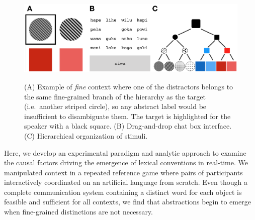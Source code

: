 \begin{figure}[t]
\begin{center}
{\includegraphics[scale=.55]{./figures/Sec2-design.png}}
{\caption{{(A) Example of \emph{fine} context where one of the distractors belongs to the same fine-grained branch of the hierarchy as the target (i.e.\ another striped circle), so any abstract label would be insufficient to disambiguate them. The target is highlighted for the speaker with a black square. (B) Drag-and-drop chat box interface. (C) Hierarchical organization of stimuli.\label{fig:context_design}}}}
\vspace{-2ex}
\end{center}
\end{figure}

Here, we develop an experimental paradigm and analytic approach to examine the causal factors driving the emergence of lexical conventions in real-time. 
We manipulated context in a repeated reference game where pairs of participants interactively coordinated on an artificial language from scratch. %
Even though a complete communication system containing a distinct word for each object is feasible and sufficient for all contexts, we find that abstractions begin to emerge when fine-grained distinctions are not necessary. %



